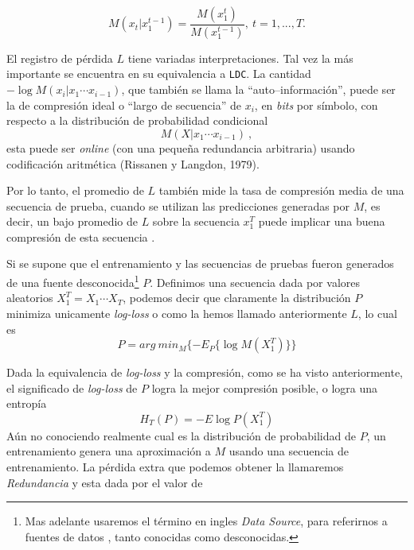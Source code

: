 \begin{equation}
M(x_{t} | x_{1}^{t-1} ) =  \dfrac{M(x_{1}^{t})}{M(x_{1}^{t-1} )},\ t=1,...,T.
\end{equation}


El registro de pérdida $L$ tiene variadas interpretaciones. Tal vez la más importante se encuentra en su equivalencia a \texttt{LDC}. La cantidad $-\log M (x_{i} | x_{1} \cdots x_{i-1}) $, que también se llama la ``auto--información'', puede ser la de compresión ideal o ``largo de secuencia'' de $x_{i}$, en \emph{bits} por símbolo, con respecto a la distribución de probabilidad condicional  \begin{equation}M (X | x_{1} \cdots x_{i-1}) \ ,\end{equation} esta puede ser  \emph{online} (con  una pequeña redundancia arbitraria) usando codificación aritmética (Rissanen y Langdon, 1979)\cite{RissanenLangdon1979}.


Por lo tanto, el promedio de $L$ también mide la tasa de compresión media de una secuencia de prueba, cuando se utilizan las predicciones generadas por $M$, es decir, un bajo promedio de $L$ %
sobre la secuencia $x_{1}^{T}$ puede implicar una buena compresión de esta secuencia \cite{Begleiter2004}.

Si se supone que el entrenamiento y las secuencias de pruebas fueron generados de una fuente desconocida\footnote{Mas adelante usaremos el término en ingles \emph{Data Source}, para referirnos a fuentes de datos , tanto conocidas como desconocidas.} $P$. Definimos una secuencia dada por valores aleatorios $X_{1}^{T} = X_{1} \cdots X_{T} $, podemos decir que claramente la distribución $P$ minimiza unicamente \emph{log-loss} o como la hemos llamado anteriormente $L$, lo cual es \begin{equation}
P = arg\ min_{M} \{ - E_{P} \{\log M( X_{1}^{T} )\}   \}
\end{equation}


Dada la equivalencia de \emph{log-loss} y la compresión, como se ha visto anteriormente, el significado de \emph{log-loss} de $P$ logra la mejor compresión posible, o logra una entropía 
\begin{equation}
	H_{T}(P) = - E \log P( X_{1}^{T} ) 
\end{equation}
Aún no conociendo realmente cual es la distribución de probabilidad de $P$, un entrenamiento genera una aproximación a $M$ usando una secuencia de entrenamiento. La pérdida extra que podemos obtener la llamaremos \emph{Redundancia} y esta dada por el valor de

